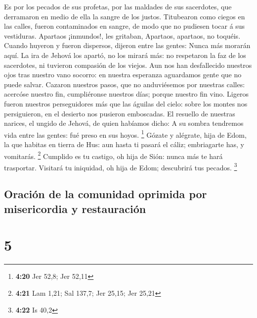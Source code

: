  Es por los pecados de sus profetas, por las maldades de
sus sacerdotes, que derramaron en medio de ella la sangre de los justos.
 Titubearon como ciegos en las calles, fueron
contaminados en sangre, de modo que no pudiesen tocar á sus vestiduras.
 Apartaos ¡inmundos!, les gritaban, Apartaos, apartaos,
no toquéis. Cuando huyeron y fueron dispersos, dijeron entre las gentes:
Nunca más morarán aquí.  La ira de Jehová los apartó, no
los mirará más: no respetaron la faz de los sacerdotes, ni tuvieron
compasión de los viejos.  Aun nos han desfallecido
nuestros ojos tras nuestro vano socorro: en nuestra esperanza aguardamos
gente que no puede salvar.  Cazaron nuestros pasos, que
no anduviésemos por nuestras calles: acercóse nuestro fin, cumpliéronse
nuestros días; porque nuestro fin vino.  Ligeros fueron
nuestros perseguidores más que las águilas del cielo: sobre los montes
nos persiguieron, en el desierto nos pusieron emboscadas.
 El resuello de nuestras narices, el ungido de Jehová, de
quien habíamos dicho: A su sombra tendremos vida entre las gentes: fué
preso en sus hoyos. \footnote{\textbf{4:20} Jer 52,8; Jer 52,11}
 Gózate y alégrate, hija de Edom, la que habitas en
tierra de Hus: aun hasta ti pasará el cáliz; embriagarte has, y
vomitarás. \footnote{\textbf{4:21} Lam 1,21; Sal 137,7; Jer 25,15; Jer
  25,21}  Cumplido es tu castigo, oh hija de Sión: nunca
más te hará trasportar. Visitará tu iniquidad, oh hija de Edom;
descubrirá tus pecados. \footnote{\textbf{4:22} Is 40,2}

\hypertarget{oraciuxf3n-de-la-comunidad-oprimida-por-misericordia-y-restauraciuxf3n}{%
\subsection{Oración de la comunidad oprimida por misericordia y
restauración}\label{oraciuxf3n-de-la-comunidad-oprimida-por-misericordia-y-restauraciuxf3n}}

\hypertarget{section-4}{%
\section{5}\label{section-4}}

